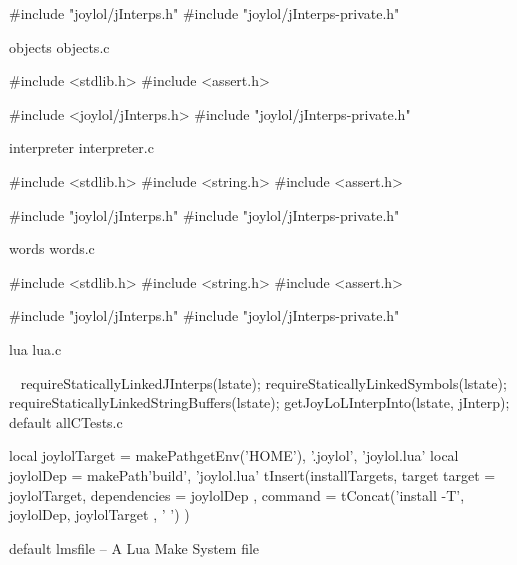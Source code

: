 #include "joylol/jInterps.h"
#include "joylol/jInterps-private.h"
\stopCCode

\createCCodeFile%
  {objects}%
  {objects.c}%
  {}

\startCCode
#include <stdlib.h>
#include <assert.h>

#include <joylol/jInterps.h>
#include "joylol/jInterps-private.h"
\stopCCode

\createCCodeFile%
  {interpreter}%
  {interpreter.c}%
  {}

\startCCode
#include <stdlib.h>
#include <string.h>
#include <assert.h>

#include "joylol/jInterps.h"
#include "joylol/jInterps-private.h"
\stopCCode

\createCCodeFile%
  {words}%
  {words.c}%
  {}

\startCCode
#include <stdlib.h>
#include <string.h>
#include <assert.h>

#include "joylol/jInterps.h"
#include "joylol/jInterps-private.h"
\stopCCode

\createCCodeFile%
  {lua}%
  {lua.c}%
  {}

\CTestsSetup\
\startCTest
  requireStaticallyLinkedJInterps(lstate);
  requireStaticallyLinkedSymbols(lstate);
  requireStaticallyLinkedStringBuffers(lstate);
  getJoyLoLInterpInto(lstate, jInterp);
\stopCTest
\createCTestFile%
  {default}%
  {allCTests.c}%
  {}


\startLmsfile
local joylolTarget = makePath{getEnv('HOME'), '.joylol', 'joylol.lua'}
local joylolDep    = makePath{'build', 'joylol.lua'}
tInsert(installTargets, target{
  target       = joylolTarget,
  dependencies = { joylolDep },
  command      = tConcat({'install -T', joylolDep, joylolTarget }, ' ')
})
\stopLmsfile




\createLmsfileFile%
  {default}%
  {lmsfile}%
  {-- A Lua Make System file}

